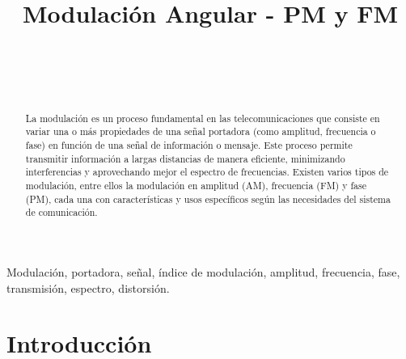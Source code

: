 \documentclass[conference]{IEEEtran}
\begin{document}
	
	\title{Modulación Angular - PM y FM}
	\author{
		\\
		\\
		\\
		\and
		\and
		\and
	}
	
	\maketitle
	\begin{abstract}
		La modulación es un proceso fundamental en las telecomunicaciones que consiste en variar una o más propiedades de una señal portadora (como amplitud, frecuencia o fase) en función de una señal de información o mensaje. Este proceso permite transmitir información a largas distancias de manera eficiente, minimizando interferencias y aprovechando mejor el espectro de frecuencias. Existen varios tipos de modulación, entre ellos la modulación en amplitud (AM), frecuencia (FM) y fase (PM), cada una con características y usos específicos según las necesidades del sistema de comunicación.
		
	\end{abstract}
	
	\begin{IEEEkeywords}
		Modulación, portadora, señal, índice de modulación, amplitud, frecuencia, fase, transmisión, espectro, distorsión.
	\end{IEEEkeywords}
	
	\section{Introducción}
	
\end{document}
